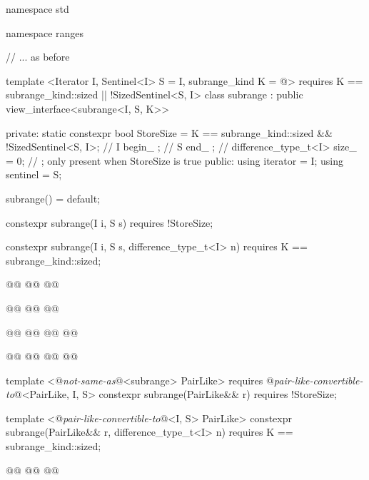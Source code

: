 \begin{codeblock}
namespace std { namespace ranges {
  // ... as before

  template <Iterator I, Sentinel<I> S = I, subrange_kind K = @\seebelow@>
    requires K == subrange_kind::sized || !SizedSentinel<S, I>
  class subrange : public view_interface<subrange<I, S, K>> {
  private:
    static constexpr bool StoreSize =
      K == subrange_kind::sized && !SizedSentinel<S, I>; // \expos
    I begin_ {}; // \expos
    S end_ {}; // \expos
    difference_type_t<I> size_ = 0; // \expos; only present when StoreSize is true
  public:
    using iterator = I;
    using sentinel = S;

    subrange() = default;

    constexpr subrange(I i, S s) requires !StoreSize;

    constexpr subrange(I i, S s, difference_type_t<I> n)
      requires K == subrange_kind::sized;

    @@
    @@
      @@

    @@
    @@
      @@

    @@
    @@
      @@
    @@

    @@
    @@
    @@
      @@

    template <@\textit{not-same-as}@<subrange> PairLike>
      requires @\textit{pair-like-convertible-to}@<PairLike, I, S>
    constexpr subrange(PairLike&& r) requires !StoreSize;

    template <@\textit{pair-like-convertible-to}@<I, S> PairLike>
    constexpr subrange(PairLike&& r, difference_type_t<I> n)
      requires K == subrange_kind::sized;

    @@
      @@
    @@

}}}
\end{codeblock}
